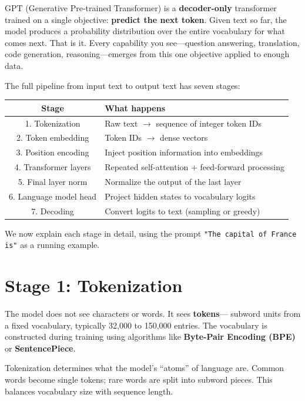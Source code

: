\documentclass[11pt, twoside, openright]{memoir}
\begin{document}
GPT (Generative Pre-trained Transformer) is a \textbf{decoder-only}
transformer trained on a single objective: \textbf{predict the next token}.
Given text so far, the model produces a probability distribution over the
entire vocabulary for what comes next.  That is it.  Every capability you
see---question answering, translation, code generation, reasoning---emerges
from this one objective applied to enough data.

The full pipeline from input text to output text has seven stages:

\begin{center}\small
\begin{tabular}{@{}cl@{}}
\toprule
\textbf{Stage} & \textbf{What happens} \\
\midrule
1. Tokenization     & Raw text $\to$ sequence of integer token IDs \\
2. Token embedding  & Token IDs $\to$ dense vectors \\
3. Position encoding & Inject position information into embeddings \\
4. Transformer layers & Repeated self-attention + feed-forward processing \\
5. Final layer norm  & Normalize the output of the last layer \\
6. Language model head & Project hidden states to vocabulary logits \\
7. Decoding          & Convert logits to text (sampling or greedy) \\
\bottomrule
\end{tabular}
\end{center}

We now explain each stage in detail, using the prompt
\texttt{"The capital of France is"} as a running example.

\section{Stage 1: Tokenization}

The model does not see characters or words.  It sees \textbf{tokens}---
subword units from a fixed vocabulary, typically 32,000 to 150,000 entries.
The vocabulary is constructed during training using algorithms like
\textbf{Byte-Pair Encoding (BPE)} or \textbf{SentencePiece}.

\begin{keyidea}
Tokenization determines what the model's ``atoms'' of language are.  Common
words become single tokens; rare words are split into subword pieces.  This
balances vocabulary size with sequence length.
\end{keyidea}
\end{document}
